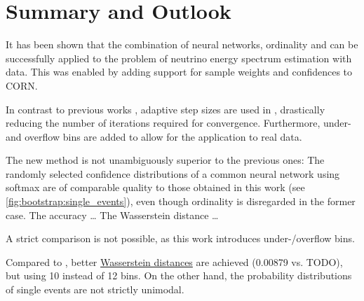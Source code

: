 \chapter{Summary and Outlook} \label{sec:summary}

It has been shown that
the combination of neural networks, ordinality and \dsea{}
  can be successfully applied to
  the problem of neutrino energy spectrum estimation
  with \icecube{} data.
This was enabled by
  adding support for
    sample weights
    and confidences
  to \ac{CORN}.

In contrast to previous works \cite{dsea_jan, dsea_samuel},
  adaptive step sizes \cite{dsea_mirko} are used in \dsea{},
    drastically reducing the number of iterations required for convergence.
Furthermore,
  under- and overflow bins are added
    to allow for the application to real data.

The new method is not unambiguously superior to the previous ones:
  The randomly selected confidence distributions of a common neural network using softmax \cite{dsea_samuel}
    are of comparable quality to those obtained in this work (see \autoref{fig:bootstrap:single_events}),
      even though ordinality is disregarded in the former case.
%
The accuracy …
The Wasserstein distance …

A strict comparison is not possible,
  as this work introduces under-/overflow bins.

Compared to \cite{dsea_jan},
  better \hyperref[sec:unfolding:metrics:wd]{Wasserstein distances} are achieved
    (\num{0.00879} vs. TODO),
    but using \num{10} instead of \num{12} bins.
On the other hand,
the probability distributions of single events are not strictly unimodal.


